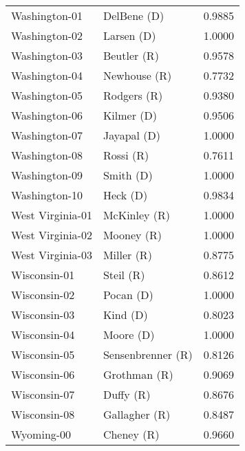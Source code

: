 \begin{longtable}{llr}
     Washington-01 &          DelBene (D) &       0.9885 \\
     Washington-02 &           Larsen (D) &       1.0000 \\
     Washington-03 &          Beutler (R) &       0.9578 \\
     Washington-04 &         Newhouse (R) &       0.7732 \\
     Washington-05 &          Rodgers (R) &       0.9380 \\
     Washington-06 &           Kilmer (D) &       0.9506 \\
     Washington-07 &          Jayapal (D) &       1.0000 \\
     Washington-08 &            Rossi (R) &       0.7611 \\
     Washington-09 &            Smith (D) &       1.0000 \\
     Washington-10 &             Heck (D) &       0.9834 \\
  West Virginia-01 &         McKinley (R) &       1.0000 \\
  West Virginia-02 &           Mooney (R) &       1.0000 \\
  West Virginia-03 &           Miller (R) &       0.8775 \\
      Wisconsin-01 &            Steil (R) &       0.8612 \\
      Wisconsin-02 &            Pocan (D) &       1.0000 \\
      Wisconsin-03 &             Kind (D) &       0.8023 \\
      Wisconsin-04 &            Moore (D) &       1.0000 \\
      Wisconsin-05 &    Sensenbrenner (R) &       0.8126 \\
      Wisconsin-06 &         Grothman (R) &       0.9069 \\
      Wisconsin-07 &            Duffy (R) &       0.8676 \\
      Wisconsin-08 &        Gallagher (R) &       0.8487 \\
        Wyoming-00 &           Cheney (R) &       0.9660 \\
\end{longtable}
